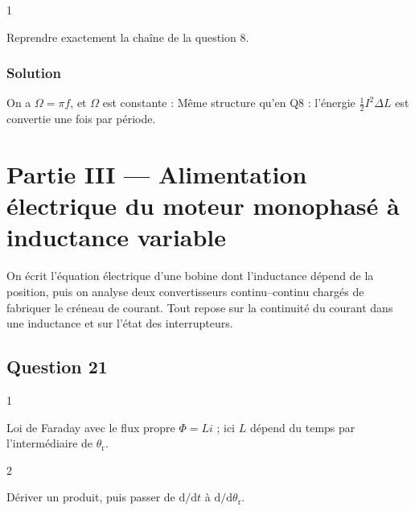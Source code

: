 \documentclass[11pt,a4paper]{article}
\newcommand{\equationajustee}[1]{%
  \sbox{\boiteequation}{$\displaystyle #1$}%
  \ifdim\wd\boiteequation>\linewidth
    \[\resizebox{\linewidth}{!}{\usebox{\boiteequation}}\]%
  \else
    \[#1\]%
  \fi}
\begin{document}
\begin{indication}{1}

Reprendre exactement la chaîne de la question 8.

\end{indication}

\hypertarget{solution-19}{%
\subsubsection{Solution}\label{solution-19}}

On a \(\Omega=\pi f\), et \(\Omega\) est constante :
\equationajustee{\begin{aligned}
\langle\mathcal P_{\text{m,ma}}\rangle&=\langle\Gamma\rangle\Omega\\
&=\frac{I^2\Delta L}{2\pi}\,\pi f\\
&=\boxed{\frac12fI^2(L_{\max}-L_{\min})}
\end{aligned}}
Même structure qu'en Q8 : l'énergie \(\tfrac12I^2\Delta L\) est convertie une fois par période.

\hypertarget{partie-iii-alimentation-uxe9lectrique-du-moteur-monophasuxe9-uxe0-inductance-variable}{%
\section{Partie III --- Alimentation électrique du moteur monophasé à inductance variable}\label{partie-iii-alimentation-uxe9lectrique-du-moteur-monophasuxe9-uxe0-inductance-variable}}

On écrit l'équation électrique d'une bobine dont l'inductance dépend de la position, puis on analyse deux convertisseurs continu--continu chargés de fabriquer le créneau de courant. Tout repose sur la continuité du courant dans une inductance et sur l'état des interrupteurs.

\hypertarget{question-21}{%
\subsection{Question 21}\label{question-21}}

\begin{indication}{1}

Loi de Faraday avec le flux propre \(\Phi=Li\) ; ici \(L\) dépend du temps par l'intermédiaire de \(\theta_{\mathrm r}\).

\end{indication}

\begin{indication}{2}

Dériver un produit, puis passer de \(\mathrm d/\mathrm dt\) à \(\mathrm d/\mathrm d\theta_{\mathrm r}\).

\end{indication}
\end{document}
